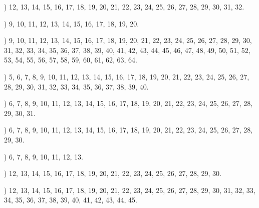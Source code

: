 \documentclass[a4paper,11pt]{article}
\begin{document}
\noindent
{}) 12, 13, 14, 15, 16, 17, 18, 19, 20, 21, 22, 23, 24,
25, 26, 27, 28, 29, 30, 31, 32.

\vspace{\spaceFour}



\noindent
{}) 9, 10, 11, 12, 13, 14, 15, 16, 17, 18, 19, 20.

\vspace{\spaceFour}



\noindent
{}) 9, 10, 11, 12, 13, 14, 15, 16, 17, 18, 19, 20, 21,
22, 23, 24, 25, 26, 27, 28, 29, 30, 31, 32, 33, 34, 35, 36, 37, 38,
39, 40, 41, 42, 43, 44, 45, 46, 47, 48, 49, 50, 51, 52, 53, 54, 55,
56, 57, 58, 59, 60, 61, 62, 63, 64.

\vspace{\spaceFour}



\noindent
{}) 5, 6, 7, 8, 9, 10, 11, 12, 13, 14, 15, 16, 17, 18,
19, 20, 21, 22, 23, 24, 25, 26, 27, 28, 29, 30, 31, 32, 33, 34, 35,
36, 37, 38, 39, 40.

\vspace{\spaceFour}



\noindent
{}) 6, 7, 8, 9, 10, 11, 12, 13, 14, 15, 16, 17, 18, 19,
20, 21, 22, 23, 24, 25, 26, 27, 28, 29, 30, 31.

\vspace{\spaceFour}



\noindent
{}) 6, 7, 8, 9, 10, 11, 12, 13, 14, 15, 16, 17, 18, 19,
20, 21, 22, 23, 24, 25, 26, 27, 28, 29, 30.

\vspace{\spaceFour}



\noindent
{}) 6, 7, 8, 9, 10, 11, 12, 13.

\vspace{\spaceFour}



\noindent
{}) 12, 13, 14, 15, 16, 17, 18, 19, 20, 21, 22, 23, 24,
25, 26, 27, 28, 29, 30.

\vspace{\spaceFour}



\noindent
{}) 12, 13, 14, 15, 16, 17, 18, 19, 20, 21, 22, 23, 24,
25, 26, 27, 28, 29, 30, 31, 32, 33, 34, 35, 36, 37, 38, 39, 40, 41,
42, 43, 44, 45.
\end{document}
